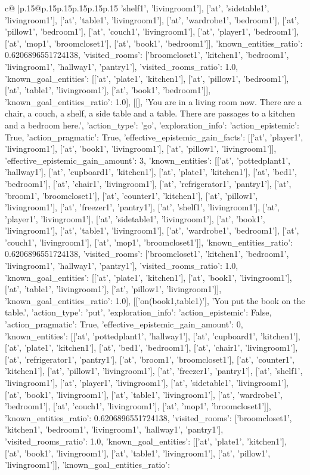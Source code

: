 \documentclass{article}
\begin{document}
{\begin{supertabular}{c@{$\;$}|p{.15\linewidth}@{}p{.15\linewidth}p{.15\linewidth}p{.15\linewidth}p{.15\linewidth}p{.15\linewidth}}
{{{'shelf1', 'livingroom1'], ['at', 'sidetable1', 'livingroom1'], ['at', 'table1', 'livingroom1'], ['at', 'wardrobe1', 'bedroom1'], ['at', 'pillow1', 'bedroom1'], ['at', 'couch1', 'livingroom1'], ['at', 'player1', 'bedroom1'], ['at', 'mop1', 'broomcloset1'], ['at', 'book1', 'bedroom1']], 'known_entities_ratio': 0.6206896551724138, 'visited_rooms': ['broomcloset1', 'kitchen1', 'bedroom1', 'livingroom1', 'hallway1', 'pantry1'], 'visited_rooms_ratio': 1.0, 'known_goal_entities': [['at', 'plate1', 'kitchen1'], ['at', 'pillow1', 'bedroom1'], ['at', 'table1', 'livingroom1'], ['at', 'book1', 'bedroom1']], 'known_goal_entities_ratio': 1.0}}], [[], 'You are in a living room now. There are a chair, a couch, a shelf, a side table and a table. There are passages to a kitchen and a bedroom here.', {'action_type': 'go', 'exploration_info': {'action_epistemic': True, 'action_pragmatic': True, 'effective_epistemic_gain_facts': [['at', 'player1', 'livingroom1'], ['at', 'book1', 'livingroom1'], ['at', 'pillow1', 'livingroom1']], 'effective_epistemic_gain_amount': 3, 'known_entities': [['at', 'pottedplant1', 'hallway1'], ['at', 'cupboard1', 'kitchen1'], ['at', 'plate1', 'kitchen1'], ['at', 'bed1', 'bedroom1'], ['at', 'chair1', 'livingroom1'], ['at', 'refrigerator1', 'pantry1'], ['at', 'broom1', 'broomcloset1'], ['at', 'counter1', 'kitchen1'], ['at', 'pillow1', 'livingroom1'], ['at', 'freezer1', 'pantry1'], ['at', 'shelf1', 'livingroom1'], ['at', 'player1', 'livingroom1'], ['at', 'sidetable1', 'livingroom1'], ['at', 'book1', 'livingroom1'], ['at', 'table1', 'livingroom1'], ['at', 'wardrobe1', 'bedroom1'], ['at', 'couch1', 'livingroom1'], ['at', 'mop1', 'broomcloset1']], 'known_entities_ratio': 0.6206896551724138, 'visited_rooms': ['broomcloset1', 'kitchen1', 'bedroom1', 'livingroom1', 'hallway1', 'pantry1'], 'visited_rooms_ratio': 1.0, 'known_goal_entities': [['at', 'plate1', 'kitchen1'], ['at', 'book1', 'livingroom1'], ['at', 'table1', 'livingroom1'], ['at', 'pillow1', 'livingroom1']], 'known_goal_entities_ratio': 1.0}}], [['on(book1,table1)'], 'You put the book on the table.', {'action_type': 'put', 'exploration_info': {'action_epistemic': False, 'action_pragmatic': True, 'effective_epistemic_gain_amount': 0, 'known_entities': [['at', 'pottedplant1', 'hallway1'], ['at', 'cupboard1', 'kitchen1'], ['at', 'plate1', 'kitchen1'], ['at', 'bed1', 'bedroom1'], ['at', 'chair1', 'livingroom1'], ['at', 'refrigerator1', 'pantry1'], ['at', 'broom1', 'broomcloset1'], ['at', 'counter1', 'kitchen1'], ['at', 'pillow1', 'livingroom1'], ['at', 'freezer1', 'pantry1'], ['at', 'shelf1', 'livingroom1'], ['at', 'player1', 'livingroom1'], ['at', 'sidetable1', 'livingroom1'], ['at', 'book1', 'livingroom1'], ['at', 'table1', 'livingroom1'], ['at', 'wardrobe1', 'bedroom1'], ['at', 'couch1', 'livingroom1'], ['at', 'mop1', 'broomcloset1']], 'known_entities_ratio': 0.6206896551724138, 'visited_rooms': ['broomcloset1', 'kitchen1', 'bedroom1', 'livingroom1', 'hallway1', 'pantry1'], 'visited_rooms_ratio': 1.0, 'known_goal_entities': [['at', 'plate1', 'kitchen1'], ['at', 'book1', 'livingroom1'], ['at', 'table1', 'livingroom1'], ['at', 'pillow1', 'livingroom1']], 'known_goal_entities_ratio': }}}
\end{supertabular}}
\end{document}
